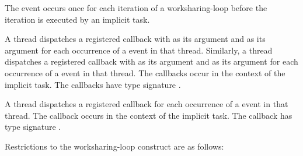 The  event occurs once for each iteration of a
worksharing-loop before the iteration is executed by an implicit task.

\tools
A thread dispatches a registered  callback with
 as its  argument and 
as its  argument for each occurrence of a 
event in that thread. Similarly, a thread dispatches a registered
 callback with  as its
 argument and  as its  argument
for each occurrence of a  event in that thread. The callbacks
occur in the context of the implicit task. The callbacks have type
signature .

A thread dispatches a registered 
callback for each occurrence of a  
event in that thread. The callback occurs in the
context of the implicit task.  The callback has type signature
. 

\restrictions
Restrictions to the worksharing-loop construct are as follows:

